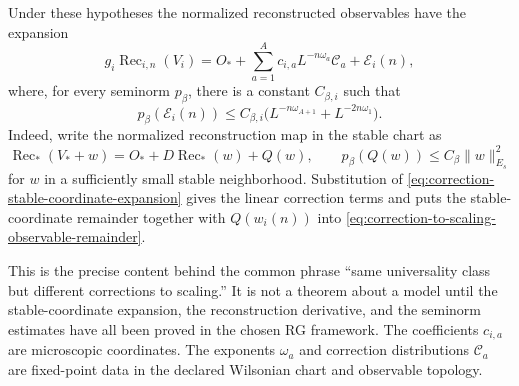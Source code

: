 Under these hypotheses the normalized reconstructed observables have the
expansion
\begin{equation}
  g_i\operatorname{Rec}_{i,n}(V_i)
  =
  O_\ast+
  \sum_{a=1}^{A}c_{i,a}L^{-n\omega_a}\mathcal C_a
  +
  \mathcal E_i(n),
  \label{eq:correction-to-scaling-observable-expansion}
\end{equation}
where, for every seminorm \(p_\beta\), there is a constant
\(C_{\beta,i}\) such that
\begin{equation}
  p_\beta(\mathcal E_i(n))
  \le
  C_{\beta,i}\bigl(L^{-n\omega_{A+1}}+L^{-2n\omega_1}\bigr).
  \label{eq:correction-to-scaling-observable-remainder}
\end{equation}
Indeed, write the normalized reconstruction map in the stable chart as
\[
  \operatorname{Rec}_{\ast}(V_\ast+w)
  =
  O_\ast+D\operatorname{Rec}_{\ast}(w)+Q(w),
  \qquad
  p_\beta(Q(w))\le C_\beta\|w\|_{E_s}^2
\]
for \(w\) in a sufficiently small stable neighborhood.  Substitution of
\eqref{eq:correction-stable-coordinate-expansion} gives the linear
correction terms and puts the stable-coordinate remainder together with
\(Q(w_i(n))\) into
\eqref{eq:correction-to-scaling-observable-remainder}.

This is the precise content behind the common phrase ``same universality
class but different corrections to scaling.''  It is not a theorem about a
model until the stable-coordinate expansion, the reconstruction derivative,
and the seminorm estimates have all been proved in the chosen RG framework.
The coefficients \(c_{i,a}\) are microscopic coordinates.  The exponents
\(\omega_a\) and correction distributions \(\mathcal C_a\) are fixed-point
data in the declared Wilsonian chart and observable topology.

